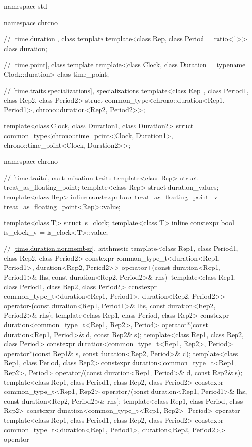 \begin{codeblock}
namespace std {
  namespace chrono {
    // \ref{time.duration}, class template 
    template<class Rep, class Period = ratio<1>> class duration;

    // \ref{time.point}, class template 
    template<class Clock, class Duration = typename Clock::duration> class time_point;
  }

  // \ref{time.traits.specializations},  specializations
  template<class Rep1, class Period1, class Rep2, class Period2>
    struct common_type<chrono::duration<Rep1, Period1>,
                       chrono::duration<Rep2, Period2>>;

  template<class Clock, class Duration1, class Duration2>
    struct common_type<chrono::time_point<Clock, Duration1>,
                       chrono::time_point<Clock, Duration2>>;

  namespace chrono {
    // \ref{time.traits}, customization traits
    template<class Rep> struct treat_as_floating_point;
    template<class Rep> struct duration_values;
    template<class Rep>
      inline constexpr bool treat_as_floating_point_v = treat_as_floating_point<Rep>::value;

    template<class T> struct is_clock;
    template<class T> inline constexpr bool is_clock_v = is_clock<T>::value;

    // \ref{time.duration.nonmember},  arithmetic
    template<class Rep1, class Period1, class Rep2, class Period2>
      constexpr common_type_t<duration<Rep1, Period1>, duration<Rep2, Period2>>
        operator+(const duration<Rep1, Period1>& lhs, const duration<Rep2, Period2>& rhs);
    template<class Rep1, class Period1, class Rep2, class Period2>
      constexpr common_type_t<duration<Rep1, Period1>, duration<Rep2, Period2>>
        operator-(const duration<Rep1, Period1>& lhs, const duration<Rep2, Period2>& rhs);
    template<class Rep1, class Period, class Rep2>
      constexpr duration<common_type_t<Rep1, Rep2>, Period>
        operator*(const duration<Rep1, Period>& d, const Rep2& s);
    template<class Rep1, class Rep2, class Period>
      constexpr duration<common_type_t<Rep1, Rep2>, Period>
        operator*(const Rep1& s, const duration<Rep2, Period>& d);
    template<class Rep1, class Period, class Rep2>
      constexpr duration<common_type_t<Rep1, Rep2>, Period>
        operator/(const duration<Rep1, Period>& d, const Rep2& s);
    template<class Rep1, class Period1, class Rep2, class Period2>
      constexpr common_type_t<Rep1, Rep2>
        operator/(const duration<Rep1, Period1>& lhs, const duration<Rep2, Period2>& rhs);
    template<class Rep1, class Period, class Rep2>
      constexpr duration<common_type_t<Rep1, Rep2>, Period>
        operator%
    template<class Rep1, class Period1, class Rep2, class Period2>
      constexpr common_type_t<duration<Rep1, Period1>, duration<Rep2, Period2>>
        operator%

}}
\end{codeblock}
